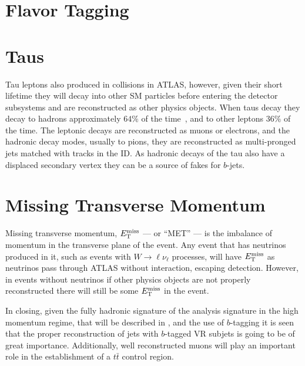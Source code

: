 \section{Flavor Tagging}\label{section:flavor_tagging}


\section{Taus}\label{section:taus}

Tau leptons also produced in collisions in ATLAS, however, given their short lifetime they will decay into other SM particles before entering the detector subsystems and are reconstructed as other physics objects.
When taus decay they decay to hadrons approximately $64\%$ of the time~\cite{Gallinaro:2014eha}, and to other leptons $36\%$ of the time.
The leptonic decays are reconstructed as muons or electrons, and the hadronic decay modes, usually to pions, they are reconstructed as multi-pronged jets matched with tracks in the ID.
As hadronic decays of the tau also have a displaced secondary vertex they can be a source of fakes for $b$-jets.

\section{Missing Transverse Momentum}\label{section:MET}

Missing transverse momentum, $E_{\mathrm{T}}^{\mathrm{miss}}$ --- or ``MET'' --- is the imbalance of momentum in the transverse plane of the event.
Any event that has neutrinos produced in it, such as events with $W \to \ell \nu_{\ell}$ processes, will have $E_{\mathrm{T}}^{\mathrm{miss}}$ as neutrinos pass through ATLAS without interaction, escaping detection.
However, in events without neutrinos if other physics objects are not properly reconstructed there will still be some $E_{\mathrm{T}}^{\mathrm{miss}}$ in the event.

In closing, given the fully hadronic signature of the analysis signature in the high momentum regime, that will be described in , and the use of $b$-tagging it is seen that the proper reconstruction of \largeR{} jets with $b$-tagged VR subjets is going to be of great importance.
Additionally, well reconstructed muons will play an important role in the establishment of a $t\bar{t}$ control region.
